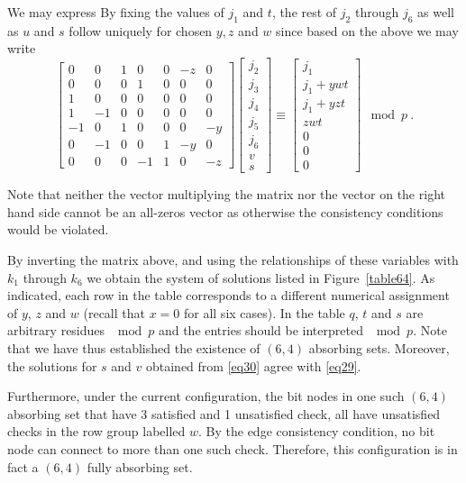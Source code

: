 {We may express By fixing the values of $j_1$ and $t$, the rest of
$j_2$ through $j_6$ as well as $u$ and $s$ follow uniquely for
chosen $y,z$ and $w$ since based on the above we may write
\begin{equation}\label{eq30}
\left[ \begin{array}{ccccccc} 0 & 0 & 1 & 0 & 0 & -z &0\\
0 & 0 & 0 & 1 & 0 & 0 &0\\
1 & 0 & 0 & 0 & 0 & 0 &0\\
1 & -1 & 0 & 0 & 0 & 0 &0\\
-1 & 0 & 1 & 0 & 0 & 0 &-y\\
0 & -1 & 0 & 0 & 1 & -y &0\\
0 & 0 & 0 & -1 & 1 & 0 & -z
\end{array}\right] \left[\begin{array}{c}
j_2\\j_3\\j_4\\j_5\\j_6\\v\\s\end{array}\right] \equiv
\left[\begin{array}{c}j_1\\j_1+ywt\\j_1+yzt\\zwt\\0\\0\\0\end{array}\right]
\mod p~.
\end{equation}

Note that neither the vector multiplying the matrix nor the vector
on the right hand side cannot be an all-zeros vector as otherwise
the consistency conditions would be violated.

By inverting the matrix above, and using the relationships of these
variables with $k_1$ through $k_6$ we obtain the system of solutions
listed in Figure~\ref{table64}. As indicated, each row in the table
corresponds to a different numerical assignment of $y$, $z$ and $w$
(recall that $x=0$ for all six cases). In the table $q$, $t$ and $s$
are arbitrary residues $\mod p$ and the entries should be
interpreted $\mod p$. Note that we have thus established the
existence of $(6,4)$ absorbing sets. Moreover, the solutions for $s$
and $v$ obtained from \eqref{eq30} agree with \eqref{eq29}.

Furthermore, under the current configuration, the bit nodes in one
such $(6,4)$ absorbing set that have 3 satisfied and 1 unsatisfied
check, all have unsatisfied checks in the row group labelled $w$. By
the edge consistency condition, no bit node can connect to more than
one such check. Therefore, this configuration is in fact a $(6,4)$
fully absorbing set.

}
